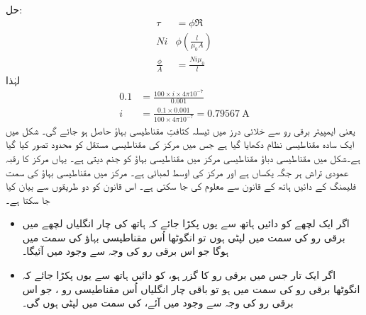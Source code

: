 حل:
\begin{align*}
\tau&=\phi \Re\\
N i & \phi \left(\frac{l}{\mu_0 A} \right)\\
\frac{\phi}{A}&=\frac{ N i \mu_0}{l}
\end{align*}
لہٰذا
\begin{align*}
0.1&=\frac{100 \times i \times 4 \pi  10^{-7}}{0.001}\\
i&=\frac{0.1 \times 0.001}{100 \times 4 \pi  10^{-7}}=\SI{0.79567}{\ampere}
\end{align*}
یعنی  ایمپیئر برقی رو سے خلائی درز میں  ٹیسلہ کثافتِ مقناطیسی بہاؤ حاصل ہو جائے گی۔
%
شکل  میں ایک سادہ مقناطیسی نظام دکھایا گیا ہے جس میں مرکز کی مقناطیسی مستقل کو محدود تصور کیا گیا ہے۔شکل میں مقناطیسی دباؤ   مقناطیسی مرکز میں مقناطیسی بہاؤ  کو جنم دیتی ہے۔ یہاں مرکز کا رقبہ عمودی تراش   ہر جگہ یکساں ہے اور مرکز  کی اوسط لمبائی  ہے۔ مرکز میں مقناطیسی بہاؤ  کی سمت فلیمنگ کے دائیں ہاتھ کے قانون  سے معلوم کی جا سکتی ہے۔  اس قانون کو دو طریقوں سے بیان کیا جا سکتا ہے۔
\begin{itemize}
\item
اگر ایک لچھے کو دائیں ہاتھ سے یوں پکڑا  جائے کہ ہاتھ کی چار انگلیاں لچھے میں برقی رو کی سمت میں لپٹی  ہوں تو انگوٹھا اُس مقناطیسی بہاؤ کی سمت میں ہوگا جو اس برقی رو کی وجہ سے وجود میں آئیگا۔
\item
اگر ایک تار جس میں برقی رو کا گزر ہو، کو دائیں ہاتھ سے یوں پکڑا جائے کہ انگوٹھا  برقی رو  کی سمت میں ہو تو باقی چار انگلیاں اُس مقناطیسی  رو ، جو اس برقی رو کی وجہ سے وجود میں آئے،  کی سمت میں لپٹی ہوں گی۔
\end{itemize}

